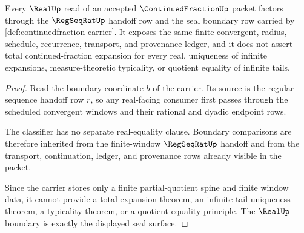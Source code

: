 \begin{theorem}
\label{thm:continuedfraction-real-boundary}
Every $\RealUp$ read of an accepted $\ContinuedFractionUp$ packet factors
through the $\RegSeqRatUp$ handoff row and the seal boundary row carried by
\autoref{def:continuedfraction-carrier}. It exposes the same finite
convergent, radius, schedule, recurrence, transport, and provenance ledger,
and it does not assert total continued-fraction expansion for every real,
uniqueness of infinite expansions, measure-theoretic typicality, or quotient
equality of infinite tails.
\end{theorem}
\begin{proof}
Read the boundary coordinate $b$ of the carrier. Its source is the regular
sequence handoff row $r$, so any real-facing consumer first passes through the
scheduled convergent windows and their rational and dyadic endpoint rows.

The classifier has no separate real-equality clause. Boundary comparisons are
therefore inherited from the finite-window $\RegSeqRatUp$ handoff and from the
transport, continuation, ledger, and provenance rows already visible in the
packet.

Since the carrier stores only a finite partial-quotient spine and finite
window data, it cannot provide a total expansion theorem, an infinite-tail
uniqueness theorem, a typicality theorem, or a quotient equality principle.
The $\RealUp$ boundary is exactly the displayed seal surface.
\end{proof}

